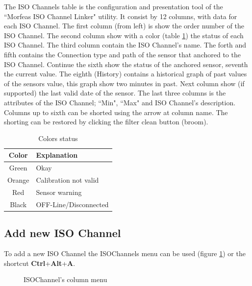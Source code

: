 The ISO Channels table is the configuration and presentation tool of the ``Morfeas ISO Channel Linker" utility.
It consist by 12 columns, with data for each ISO Channel.
The first column (from left) is show the order number of the ISO Channel.
The second column show with a color (table \ref{tab:col}) the status of each ISO Channel.
The third column contain the ISO Channel's name.
The forth and fifth contains the Connection type and path of the sensor that anchored to the ISO Channel.
Continue the sixth show the status of the anchored sensor, seventh the current value.
The eighth (History) contains a historical graph of past values of the sensors value, this graph show two minutes in past.
Next column show (if supported) the last valid date of the sensor.
The last three columns is the attributes of the ISO Channel; ``Min", ``Max" and ISO Channel's description.\\
Columns up to sixth can be shorted using the arrow at column name.
The shorting can be restored by clicking the filter clean button (broom).

\begin{table}[h!]
	\begin{center}
		\begin{tabular}{|c|l|}
			\hline
			\textbf{Color} & \textbf{Explanation}\\
			\hline
			Green & Okay\\
			\hline
			Orange & Calibration not valid\\
			\hline
			Red & Sensor warning\\
			\hline
			Black & OFF-Line/Disconnected\\
			\hline
		\end{tabular}
		\caption{Colors status}
		\label{tab:col}
	\end{center}
\end{table}

\subsection{Add new ISO Channel}
To add a new ISO Channel the ISOChannels menu can be used (figure \ref{fig:ISOCH_menu}) or the shortcut \textbf{Ctrl}+\textbf{Alt}+\textbf{A}.

\begin{figure}[h]
\centering
	\caption{ISOChannel's column menu}
	\label{fig:ISOCH_menu}
\end{figure}

